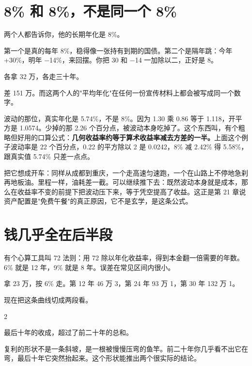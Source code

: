 \section{8\% 和 8\%，不是同一个 8\%}

两个人都告诉你，他的长期年化是 8\%。

第一个是真的每年 8\%，稳得像一张持有到期的国债。第二个是隔年跳：今年 +30\%，明年 −14\%，来回摆。你把 30 和 −14 一加除以二，正好是 8。

各拿 32 万，各走三十年。

\begin{barfig}
\end{barfig}

差 151 万。而这两个人的"平均年化"在任何一份宣传材料上都会被写成同一个数字。

波动的那位，真实年化是 5.74\%，不是 8\%。因为 1.30 乘 0.86 等于 1.118，开平方是 1.0574。少掉的那 2.26 个百分点，被波动本身吃掉了。这个东西叫，有个粗略但好用的口算公式：\textbf{几何收益率约等于算术收益率减去方差的一半。}上面这个例子波动率是 22 个百分点，0.22 的平方除以 2 是 0.0242，8\% 减 2.42\% 得 5.58\%，跟真实值 5.74\% 只差一点点。

把它想成开车：同样从成都到重庆，一个走高速匀速跑，一个在山路上不停地急刹再地板油。里程一样，油耗差一截。可以继续推下去：既然波动本身就是成本，那么在收益率不变的前提下把波动压下来，等于凭空提高了收益。这正是第 21 章说资产配置是"免费午餐"的真正原因，它不是玄学，是这条公式。

\section{钱几乎全在后半段}

有个心算工具叫 72 法则：用 72 除以年化收益率，得到本金翻一倍需要的年数。6\% 就是 12 年，9\% 就是 8 年。误差在常见区间内很小。

拿 23 万，按 6\% 走。第 12 年 46 万 3，第 24 年 93 万 1，第 30 年 132 万 1。

现在把这条曲线切成两段看。

\begin{statrow}{2}
\end{statrow}

最后十年的收成，超过了前二十年的总和。

复利的形状不是一条斜坡，是一根被慢慢压弯的鱼竿。前二十年你几乎看不出它在弯，最后十年它突然抬起来。这个形状能推出两个很实际的结论。


